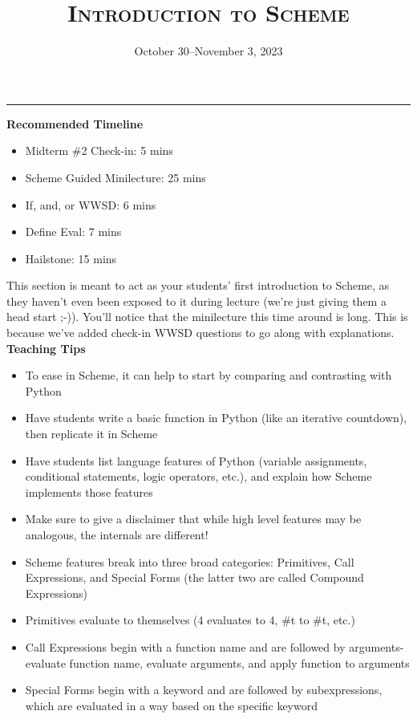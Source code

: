 \documentclass{exam}
\title{\textsc{Introduction to Scheme}}
\date{October 30--November 3, 2023}
\begin{document}
\maketitle
\rule{\textwidth}{0.15em}

\begin{meta}
\begin{blocksection}
    \textbf{Recommended Timeline}
    \begin{itemize}
        \item Midterm \#2 Check-in: 5 mins
        \item Scheme Guided Minilecture: 25 mins
        \item If, and, or WWSD: 6 mins
        \item Define Eval: 7 mins
        \item Hailstone: 15 mins
    \end{itemize}
\end{blocksection}
\end{meta}
\begin{meta}
    This section is meant to act as your students' first introduction to Scheme, as they haven't even been exposed to it during lecture (we're just giving them a head start ;-)). You'll notice that the minilecture this time around is long. This is because we've added check-in WWSD questions to go along with explanations.
\textbf{Teaching Tips}
\begin{itemize}
    \item To ease in Scheme, it can help to start by comparing and contrasting with Python
    \item Have students write a basic function in Python (like an iterative countdown), then replicate it in Scheme
    \item Have students list language features of Python (variable assignments, conditional statements, logic operators, etc.), and explain how Scheme implements those features
    \item Make sure to give a disclaimer that while high level features may be analogous, the internals are different!
    \item Scheme features break into three broad categories: Primitives, Call Expressions, and Special Forms (the latter two are called Compound Expressions)
    \item Primitives evaluate to themselves (4 evaluates to 4, \#t to \#t, etc.)
    \item Call Expressions begin with a function name and are followed by arguments- evaluate function name, evaluate arguments, and apply function to arguments
    \item Special Forms begin with a keyword and are followed by subexpressions, which are evaluated in a way based on the specific keyword
\end{itemize}
\end{meta}
\end{document}
